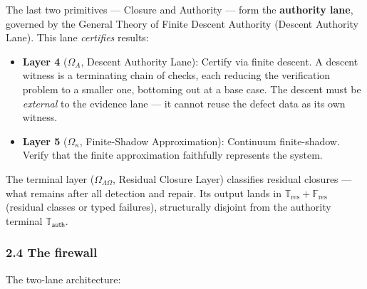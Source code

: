 \documentclass[
  10pt,
]{article}
\providecommand{\tightlist}{%
  \setlength{\itemsep}{0pt}\setlength{\parskip}{0pt}}
\providecommand{\tightlist}{%
  \setlength{\itemsep}{0pt}\setlength{\parskip}{0pt}}
\begin{document}
The last two primitives --- Closure and Authority --- form the \textbf{authority lane}, governed by the General Theory of Finite Descent Authority (Descent Authority Lane). This lane \emph{certifies} results:

\begin{itemize}
\tightlist
\item
  \textbf{Layer 4} (\protect\hypertarget{math-E0027-0033}{}{\(\Omega_A\)}, Descent Authority Lane): Certify via finite descent. A descent witness is a terminating chain of checks, each reducing the verification problem to a smaller one, bottoming out at a base case. The descent must be \emph{external} to the evidence lane --- it cannot reuse the defect data as its own witness.
\item
  \textbf{Layer 5} (\protect\hypertarget{math-E0028-0034}{}{\(\Omega_\kappa\)}, Finite-Shadow Approximation): Continuum finite-shadow. Verify that the finite approximation faithfully represents the system.
\end{itemize}

The terminal layer (\protect\hypertarget{math-E0007-0035}{}{\(\Omega_{\Lambda\Omega}\)}, Residual Closure Layer) classifies residual closures --- what remains after all detection and repair. Its output lands in \protect\hypertarget{math-E0008-0036}{}{\(\mathbb{T}_{\mathrm{res}} + \mathbb{F}_{\mathrm{res}}\)} (residual classes or typed failures), structurally disjoint from the authority terminal \protect\hypertarget{math-E0029-0037}{}{\(\mathbb{T}_{\mathsf{auth}}\)}.

\subsubsection{2.4 The firewall}\label{the-firewall}

The two-lane architecture:
\end{document}
